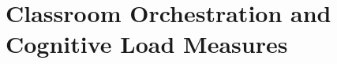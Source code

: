 \documentclass[10pt,journal,compsoc]{IEEEtran}
\begin{document}
%



\section{Classroom Orchestration and Cognitive Load Measures}\label{sec:related}
\end{document}
